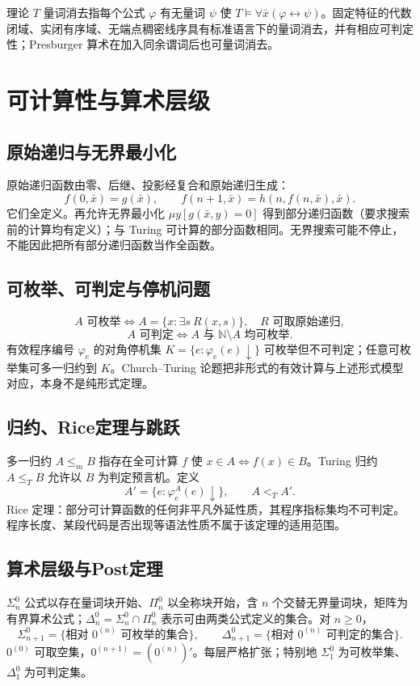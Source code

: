 \documentclass[../main.tex]{subfiles}
\begin{document}
理论 $T$ 量词消去指每个公式 $\varphi$ 有无量词 $\psi$ 使 $T\models\forall\bar x(\varphi\leftrightarrow\psi)$。固定特征的代数闭域、实闭有序域、无端点稠密线序具有标准语言下的量词消去，并有相应可判定性；Presburger 算术在加入同余谓词后也可量词消去。
\section{可计算性与算术层级}
\subsection{原始递归与无界最小化}
原始递归函数由零、后继、投影经复合和原始递归生成：
\[
f(0,\bar x)=g(\bar x),\qquad f(n+1,\bar x)=h(n,f(n,\bar x),\bar x).
\]
它们全定义。再允许无界最小化 $\mu y[g(\bar x,y)=0]$ 得到部分递归函数（要求搜索前的计算均有定义）；与 Turing 可计算的部分函数相同。无界搜索可能不停止，不能因此把所有部分递归函数当作全函数。
\subsection{可枚举、可判定与停机问题}
\[
A\text{ 可枚举}\iff A=\{x:\exists s\ R(x,s)\},\quad R\text{ 可取原始递归},
\]
\[
A\text{ 可判定}\iff A\text{ 与 }\mathbb N\setminus A\text{ 均可枚举}.
\]
有效程序编号 $\varphi_e$ 的对角停机集 $K=\{e:\varphi_e(e)\downarrow\}$ 可枚举但不可判定；任意可枚举集可多一归约到 $K$。Church--Turing 论题把非形式的有效计算与上述形式模型对应，本身不是纯形式定理。
\subsection{归约、Rice定理与跳跃}
多一归约 $A\le_mB$ 指存在全可计算 $f$ 使 $x\in A\iff f(x)\in B$。Turing 归约 $A\le_TB$ 允许以 $B$ 为判定预言机。定义
\[
A'=\{e:\varphi_e^A(e)\downarrow\},\qquad A<_TA'.
\]
Rice 定理：部分可计算函数的任何非平凡外延性质，其程序指标集均不可判定。程序长度、某段代码是否出现等语法性质不属于该定理的适用范围。
\subsection{算术层级与Post定理}
$\Sigma_n^0$ 公式以存在量词块开始、$\Pi_n^0$ 以全称块开始，含 $n$ 个交替无界量词块，矩阵为有界算术公式；$\Delta_n^0=\Sigma_n^0\cap\Pi_n^0$ 表示可由两类公式定义的集合。对 $n\ge0$，
\[
\Sigma_{n+1}^0=\{\text{相对 }0^{(n)}\text{ 可枚举的集合}\},\qquad
\Delta_{n+1}^0=\{\text{相对 }0^{(n)}\text{ 可判定的集合}\}.
\]
$0^{(0)}$ 可取空集，$0^{(n+1)}=(0^{(n)})'$。每层严格扩张；特别地 $\Sigma_1^0$ 为可枚举集、$\Delta_1^0$ 为可判定集。
\end{document}
